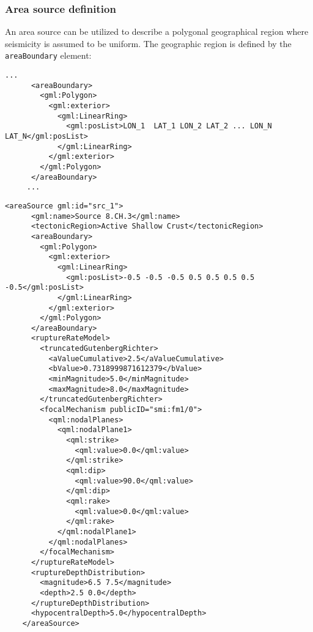 \subsubsection{Area source definition}
An area source can be utilized to describe a polygonal geographical region where seismicity is assumed to be uniform.
The geographic region is defined by the \Verb+areaBoundary+ element:
\begin{Verbatim}[frame=single]
    ...
      <areaBoundary>
        <gml:Polygon>
          <gml:exterior>
            <gml:LinearRing>
              <gml:posList>LON_1  LAT_1 LON_2 LAT_2 ... LON_N LAT_N</gml:posList>
            </gml:LinearRing>
          </gml:exterior>
        </gml:Polygon>
      </areaBoundary>
     ...
\end{Verbatim}
\begin{Verbatim}[frame=single]
    <areaSource gml:id="src_1">
      <gml:name>Source 8.CH.3</gml:name>
      <tectonicRegion>Active Shallow Crust</tectonicRegion>
      <areaBoundary>
        <gml:Polygon>
          <gml:exterior>
            <gml:LinearRing>
              <gml:posList>-0.5 -0.5 -0.5 0.5 0.5 0.5 0.5 -0.5</gml:posList>
            </gml:LinearRing>
          </gml:exterior>
        </gml:Polygon>
      </areaBoundary>
      <ruptureRateModel>
        <truncatedGutenbergRichter>
          <aValueCumulative>2.5</aValueCumulative>
          <bValue>0.7318999871612379</bValue>
          <minMagnitude>5.0</minMagnitude>
          <maxMagnitude>8.0</maxMagnitude>
        </truncatedGutenbergRichter>
        <focalMechanism publicID="smi:fm1/0">
          <qml:nodalPlanes>
            <qml:nodalPlane1>
              <qml:strike>
                <qml:value>0.0</qml:value>
              </qml:strike>
              <qml:dip>
                <qml:value>90.0</qml:value>
              </qml:dip>
              <qml:rake>
                <qml:value>0.0</qml:value>
              </qml:rake>
            </qml:nodalPlane1>
          </qml:nodalPlanes>
        </focalMechanism>
      </ruptureRateModel>
      <ruptureDepthDistribution>
        <magnitude>6.5 7.5</magnitude>
        <depth>2.5 0.0</depth>
      </ruptureDepthDistribution>
      <hypocentralDepth>5.0</hypocentralDepth>
    </areaSource>
\end{Verbatim}

